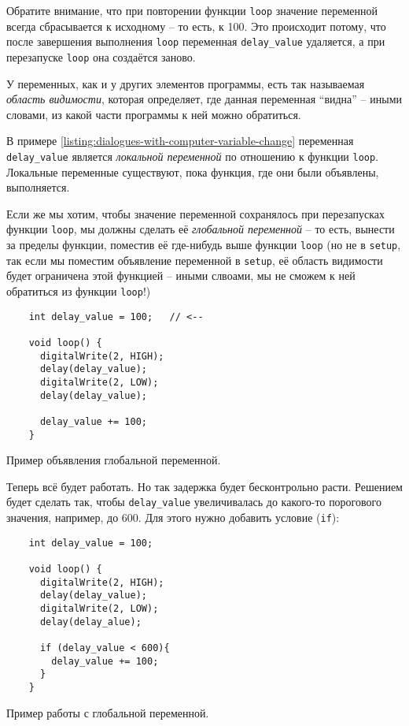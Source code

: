 \documentclass[../sparc.tex]{subfiles}
\begin{document}
Обратите внимание, что при повторении функции \texttt{loop} значение переменной
всегда сбрасывается к исходному -- то есть, к 100.  Это происходит потому, что
после завершения выполнения \texttt{loop} переменная \texttt{delay\_value}
удаляется, а при перезапуске \texttt{loop} она создаётся заново.

У переменных, как и у других элементов программы, есть так называемая
\emph{область видимости}, которая определяет, где данная переменная ``видна'' --
иными словами, из какой части программы к ней можно обратиться.

В примере \ref{listing:dialogues-with-computer-variable-change} переменная
\texttt{delay\_value} является \emph{локальной переменной} по отношению к
функции \texttt{loop}.  Локальные переменные существуют, пока функция, где они
были объявлены, выполняется.

Если же мы хотим, чтобы значение переменной сохранялось при перезапусках функции
\texttt{loop}, мы должны сделать её \emph{глобальной переменной} -- то есть,
вынести за пределы функции, поместив её где-нибудь выше функции \texttt{loop}
(но не в \texttt{setup}, так если мы поместим объявление переменной в
\texttt{setup}, её область видимости будет ограничена этой функцией -- иными
слвоами, мы не сможем к ней обратиться из функции \texttt{loop}!)

\begin{listing}[ht]
  \begin{verbatim}
    int delay_value = 100;   // <--

    void loop() {
      digitalWrite(2, HIGH);
      delay(delay_value);
      digitalWrite(2, LOW);
      delay(delay_value);

      delay_value += 100;
    }
  \end{verbatim}
  \label{listing:dialogues-with-computer-global-variable}
  \caption{Пример объявления глобальной переменной.}
\end{listing}

Теперь всё будет работать. Но так задержка будет бесконтрольно расти. Решением
будет сделать так, чтобы \texttt{delay\_value} увеличивалась до какого-то
порогового значения, например, до 600. Для этого нужно добавить условие
(\texttt{if}):

\begin{listing}[ht]
  \begin{verbatim}
    int delay_value = 100;

    void loop() {
      digitalWrite(2, HIGH);
      delay(delay_value);
      digitalWrite(2, LOW);
      delay(delay_alue);

      if (delay_value < 600){
        delay_value += 100;
      }
    }
  \end{verbatim}
  \label{listing:dialogues-with-computer-global-variable-2}
  \caption{Пример работы с глобальной переменной.}
\end{listing}
\end{document}
